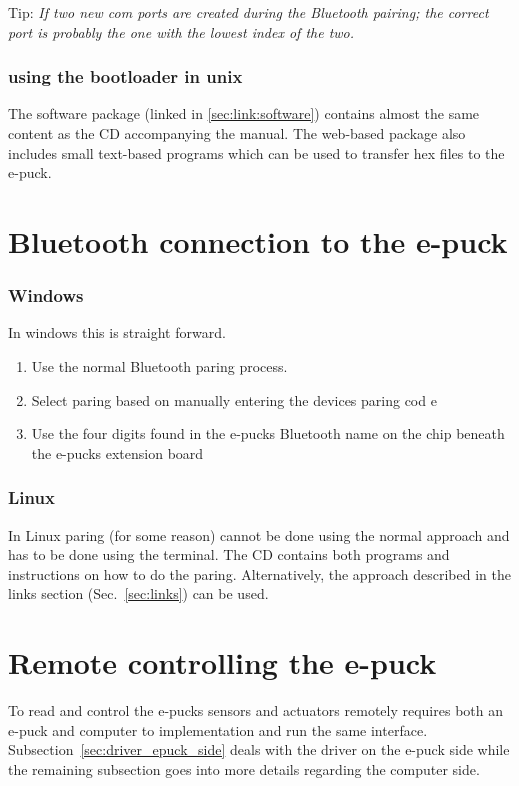 \documentclass{article}
\begin{document}
Tip: \textit{If two new com ports are created during the Bluetooth pairing; the correct port is probably the one with the lowest index of the two.} 

\subsubsection{using the bootloader in unix}
The software package (linked in \ref{sec:link:software}) contains almost the same content as the CD accompanying the manual.
The web-based package also includes small text-based programs which can be used to transfer hex files to the e-puck. 




\newpage
\section{Bluetooth connection to the e-puck}
\subsubsection*{Windows}
In windows this is straight forward.
\begin{enumerate}
\item Use the normal Bluetooth paring process.
\item Select paring based on manually entering the devices paring cod
e\item Use the four digits found in the e-pucks Bluetooth name on the chip beneath the e-pucks extension board
\end{enumerate}

\subsubsection*{Linux}
In Linux paring (for some reason) cannot be done using the normal approach and has to be done using the terminal.
The CD contains both programs and instructions on how to do the paring. Alternatively, the approach described 
in the links section (Sec.~\ref{sec:links}) can be used.













\newpage
\section{Remote controlling the e-puck}
To read and control the e-pucks sensors and actuators remotely requires both an e-puck and computer to 
implementation and run the same interface. Subsection~\ref{sec:driver_epuck_side} deals with the 
driver on the e-puck side while the remaining subsection goes into more details regarding the computer side.
\end{document}
